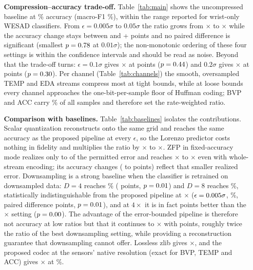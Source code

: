 \documentclass[conference]{IEEEtran}
\begin{document}
\textbf{Compression--accuracy trade-off.} Table~\ref{tab:main} shows the uncompressed baseline at \rawAcc\% accuracy (macro-F1 \rawF\%), within the range reported for wrist-only WESAD classifiers. From $\epsilon=0.005\sigma$ to $0.05\sigma$ the ratio grows from \ratioEa$\times$ to \ratioEd$\times$ while the accuracy change stays between \dAccEb{} and +\dAccEc{} points and no paired difference is significant (smallest $p=0.78$ at $0.01\sigma$); the non-monotonic ordering of these four settings is within the confidence intervals and should be read as noise. Beyond that the trade-off turns: $\epsilon=0.1\sigma$ gives \ratioEe$\times$ at \dAccEe{} points ($p=0.44$) and $0.2\sigma$ gives \ratioEf$\times$ at \dAccEf{} points ($p=0.30$). Per channel (Table~\ref{tab:channels}) the smooth, oversampled TEMP and EDA streams compress most at tight bounds, while at loose bounds every channel approaches the one-bit-per-sample floor of Huffman coding; BVP and ACC carry \pctSamplesBVPACC\% of all samples and therefore set the rate-weighted ratio.

\textbf{Comparison with baselines.} Table~\ref{tab:baselines} isolates the contributions. Scalar quantization reconstructs onto the same grid and reaches the same accuracy as the proposed pipeline at every $\epsilon$, so the Lorenzo predictor costs nothing in fidelity and multiplies the ratio by \predGainMin$\times$ to \predGainMax$\times$. ZFP in fixed-accuracy mode realizes only \zfpErrMin{} to \zfpErrMax{} of the permitted error and reaches \zfpRatioMin$\times$ to \zfpRatioMax$\times$ even with whole-stream encoding; its accuracy changes (\zfpDAccMin{} to \zfpDAccMax{} points) reflect that smaller realized error. Downsampling is a strong baseline when the classifier is retrained on downsampled data: $D=4$ reaches \dsAccC\% (\dsDAccC{} points, $p=0.01$) and $D=8$ reaches \dsAccE\%, statistically indistinguishable from the proposed pipeline at \dsPairRatioE$\times$ ($\epsilon=0.005\sigma$, \dsPairAccE\%, paired difference \dsPairDiffE{} points, $p=0.01$), and at $4\times$ it is in fact \dsPairAbsDiffC{} points better than the \dsPairRatioC$\times$ setting ($p=0.00$). The advantage of the error-bounded pipeline is therefore not accuracy at low ratios but that it continues to \ratioEd$\times$ with \dAccEd{} points, roughly twice the ratio of the best downsampling setting, while providing a reconstruction guarantee that downsampling cannot offer. Lossless zlib gives \ratioLossless$\times$, and the proposed codec at the sensors' native resolution (exact for BVP, TEMP and ACC) gives \ratioNative$\times$ at \accNative\%.
\end{document}
